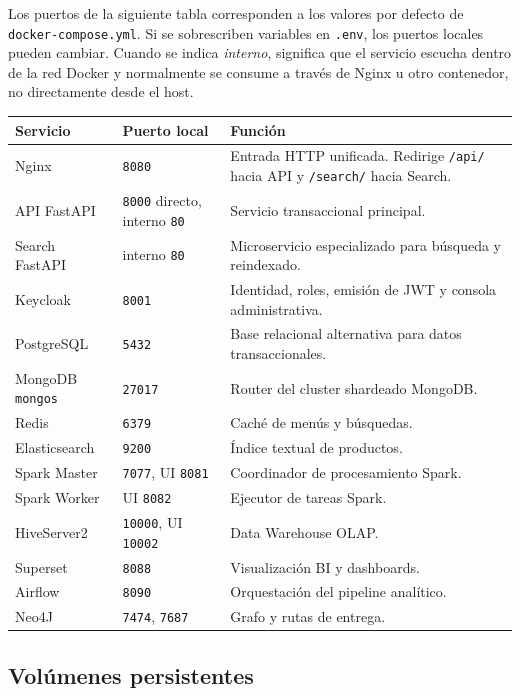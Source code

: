 \documentclass[12pt,letterpaper]{article}
\def\codefile#1{\nolinkurl{#1}}
\begin{document}
Los puertos de la siguiente tabla corresponden a los valores por defecto de \codefile{docker-compose.yml}. Si se sobrescriben variables en \codefile{.env}, los puertos locales pueden cambiar. Cuando se indica \textit{interno}, significa que el servicio escucha dentro de la red Docker y normalmente se consume a través de Nginx u otro contenedor, no directamente desde el host.

\begin{longtable}{p{}p{}p{}}
\toprule
\textbf{Servicio} & \textbf{Puerto local} & \textbf{Función}\\
\midrule
Nginx & \codefile{8080} & Entrada HTTP unificada. Redirige \codefile{/api/} hacia API y \codefile{/search/} hacia Search.\\
API FastAPI & \codefile{8000} directo, interno \codefile{80} & Servicio transaccional principal.\\
Search FastAPI & interno \codefile{80} & Microservicio especializado para búsqueda y reindexado.\\
Keycloak & \codefile{8001} & Identidad, roles, emisión de JWT y consola administrativa.\\
PostgreSQL & \codefile{5432} & Base relacional alternativa para datos transaccionales.\\
MongoDB \codefile{mongos} & \codefile{27017} & Router del cluster shardeado MongoDB.\\
Redis & \codefile{6379} & Caché de menús y búsquedas.\\
Elasticsearch & \codefile{9200} & Índice textual de productos.\\
Spark Master & \codefile{7077}, UI \codefile{8081} & Coordinador de procesamiento Spark.\\
Spark Worker & UI \codefile{8082} & Ejecutor de tareas Spark.\\
HiveServer2 & \codefile{10000}, UI \codefile{10002} & Data Warehouse OLAP.\\
Superset & \codefile{8088} & Visualización BI y dashboards.\\
Airflow & \codefile{8090} & Orquestación del pipeline analítico.\\
Neo4J & \codefile{7474}, \codefile{7687} & Grafo y rutas de entrega.\\
\bottomrule
\end{longtable}

\subsection{Volúmenes persistentes}
\end{document}

